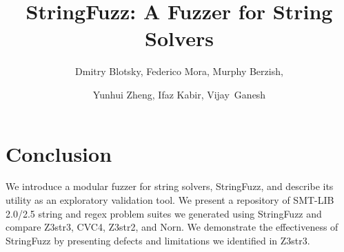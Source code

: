\documentclass{llncs}
\def\fuzzer{StringFuzz}
\def\smtfull{SMT-LIB 2.0/2.5}
\def\cvc{CVC4}
\def\us{Z3str3}
\def\usOld{Z3str2}
\def\norn{Norn}
\def\theSolvers{\us{}, \cvc{}, \usOld{}, and \norn{}}
\begin{document}
    \pagestyle{headings} %

    \title{
        \fuzzer{}: A Fuzzer for String Solvers
    }
    \titlerunning{\fuzzer{}} %

    \author{
        Dmitry Blotsky,
        Federico Mora,
        Murphy Berzish,\and
        Yunhui Zheng,
        Ifaz Kabir,
        Vijay~Ganesh
    }


    \maketitle

    
    
    
    
    
    
    
    \section{Conclusion}
    \vspace{-0.1in}
    
    We introduce a modular fuzzer for string solvers, \fuzzer{}, and describe 
its utility as an exploratory validation tool.  We present a repository of 
\smtfull{} string and regex problem suites we generated using \fuzzer{} and compare 
\theSolvers{}. We demonstrate the effectiveness of \fuzzer{} by presenting 
defects and limitations we identified in \us{}.
    
    
    

\end{document}
